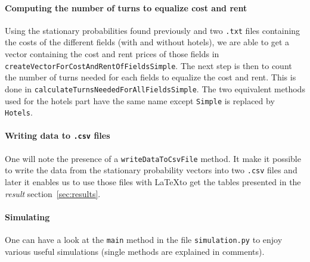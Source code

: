 \paragraph{Computing the number of turns to equalize cost and rent} %
\label{par:computing_the_number_of_turns_to_equalize_cost_and_rent}
Using the stationary probabilities found previously and two \texttt{.txt}
files containing the costs of the different fields (with and without hotels),
we are able to get a vector containing the cost and 
rent prices of those fields in \lstinline|createVectorForCostAndRentOfFieldsSimple|.
The next step is then to count the number of turns needed for each fields
to equalize the cost and rent. This is done in \lstinline|calculateTurnsNeededForAllFieldsSimple|.
The two equivalent methods used for the hotels part have the same
name except \lstinline|Simple| is replaced by \lstinline|Hotels|.

\paragraph{Writing data to \texttt{.csv} files} %
\label{par:writing_data_to_csv_files}
One will note the presence of a \lstinline|writeDataToCsvFile|
method. It make it possible to write the data from the stationary probability
vectors into two \texttt{.csv} files and later it enables us to use those
files with \LaTeX to get the tables presented in the \emph{result} section~\ref{sec:results}.

\paragraph{Simulating} %
\label{par:simulating}
One can have a look at the \texttt{main} method
in the file \lstinline|simulation.py| to enjoy various useful simulations
(single methods are explained in comments).

